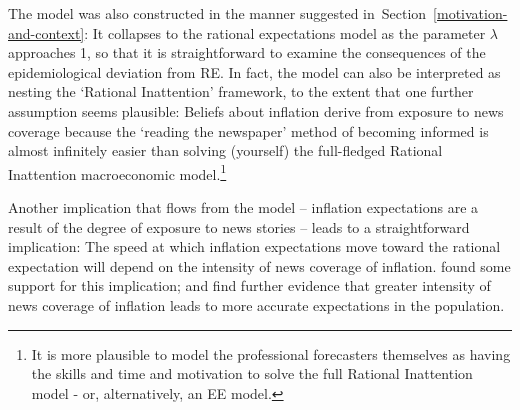 The model was also constructed in the manner suggested in~Section~\ref{motivation-and-context}: It collapses to the rational expectations model as the parameter $\lambda$ approaches 1, so that it is straightforward to examine the consequences of the epidemiological deviation from RE.  In fact, the model can also be interpreted as nesting the `Rational Inattention' framework, to the extent that one further assumption seems plausible:  Beliefs about inflation derive from exposure to news coverage because the `reading the newspaper' method of becoming informed is almost infinitely easier than solving (yourself) the full-fledged Rational Inattention macroeconomic model.\footnote{It is more plausible to model the professional forecasters themselves as having the skills and time and motivation to solve the full Rational Inattention model - or, alternatively, an EE model.}

Another implication that flows from the model -- inflation expectations are a result of the degree of exposure to news stories -- leads to a straightforward implication:  The speed at which inflation expectations move toward the rational expectation will depend on the intensity of news coverage of inflation.  \cite{carroll2003macroeconomic} found some support for this implication; \cite{lamla2014role} and \cite{larsen2021news} find further evidence that greater intensity of news coverage of inflation leads to more accurate expectations in the population.  %




